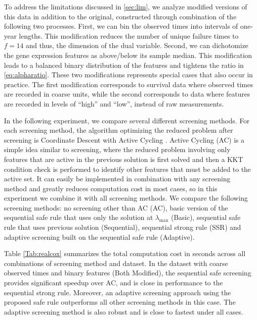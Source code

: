 To address the limitations discussed in \ref{sec:lim}, we analyze modified versions of this data in addition to the original, constructed through combination of the following two processes. First, we can bin the observed times into intervals of one-year lengths. This modification reduces the number of unique failure times to $f=14$ and thus, the dimension of the dual variable. Second, we can dichotomize the gene expression features as above/below its sample median. This modification leads to a balanced binary distribution of the features and tightens the ratio in \eqref{eq:alpharatio}. These two modifications represents special cases that also occur in practice. The first modification corresponds to survival data where observed times are recorded in coarse units, while the second corresponds to data where features are recorded in levels of ``high'' and ``low'', instead of raw measurements.

In the following experiment, we compare several different screening methods. For each screening method, the algorithm optimizing the reduced problem after screening is Coordinate Descent \citep{simon2011regularization} with Active Cycling \citep{lee2007efficient}. Active Cycling (AC) is a simple idea similar to screening, where the reduced problem involving only features that are active in the previous solution is first solved and then a KKT condition check is performed to identify other features that must be added to the active set. It can easily be implemented in combination with any screening method and greatly reduces computation cost in most cases, so in this experiment we combine it with all screening methods. We compare the following screening methods: no screening other than AC (AC), basic version of the sequential safe rule that uses only the solution at $\lambda_{\max}$ (Basic), sequential safe rule that uses previous solution (Sequential), sequential strong rule (SSR) and adaptive screening built on the sequential safe rule (Adaptive).

Table \ref{Tab:realcox} summarizes the total computation cost in seconds across all combinations of screening method and dataset. In the dataset with coarse observed times and binary features (Both Modified), the sequential safe screening provides significant speedup over AC, and is close in performance to the sequential strong rule. Moreover, an adaptive screening approach using the proposed safe rule outperforms all other screening methods in this case. The adaptive screening method is also robust and is close to fastest under all cases.

